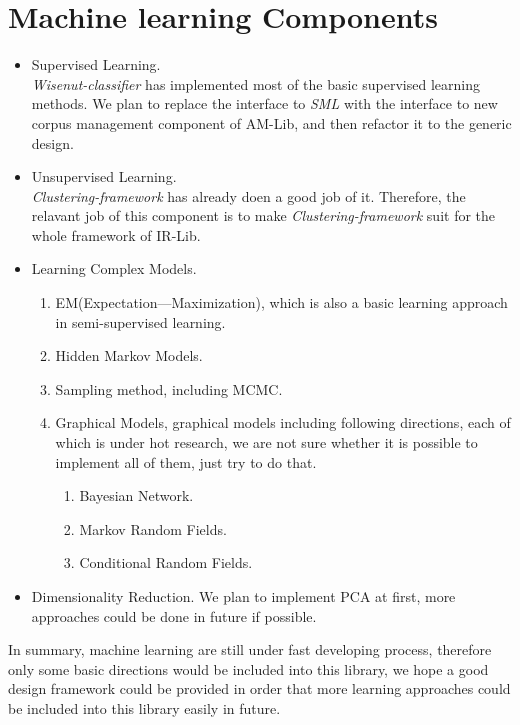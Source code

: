 \documentclass[a4paper,10pt]{article}
\begin{document}
\section{Machine learning Components}
\begin{itemize}
  \item Supervised Learning.\\
\emph{Wisenut-classifier} has implemented most of the basic supervised learning methods. We plan to replace the interface to \emph{SML}
 with the interface to new corpus management component of AM-Lib, and then refactor it to the generic design.
  \item Unsupervised Learning.\\
\emph{Clustering-framework} has already doen a good job of it. Therefore, the relavant job of this component is to make \emph{Clustering-framework}
suit for the whole framework of IR-Lib.
  \item Learning Complex Models.
    \begin{enumerate}
	\item EM(Expectation---Maximization), which is also a basic learning approach in semi-supervised learning.
	\item Hidden Markov Models.
	\item Sampling method, including MCMC.
	\item Graphical Models, graphical models including following directions, each of which is under hot research, we are not sure whether 
it is possible to implement all of them, just try to do that.
          \begin{enumerate}
            \item Bayesian Network.
            \item Markov Random Fields.
            \item Conditional Random Fields.
          \end{enumerate}
    \end{enumerate}
  \item Dimensionality Reduction. We plan to implement PCA at first, more approaches could be done in future if possible.
\end{itemize}
\par
In summary, machine learning are still under fast developing process, therefore only some basic directions would be included into this library, we hope a 
good design framework could be provided in order that more learning approaches could be included into this library easily in future.
\end{document}
